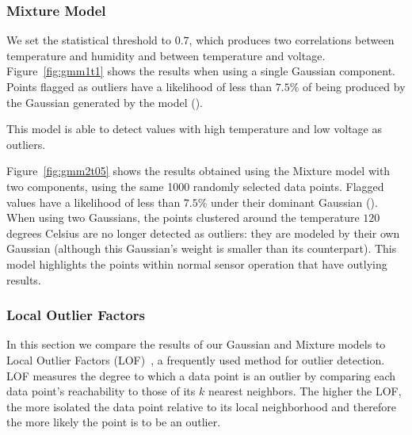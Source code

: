 \subsubsection{Mixture Model}
We set the statistical threshold to $0.7$, which produces two correlations between temperature and humidity and between temperature and voltage. 
Figure~\ref{fig:gmm1t1} shows the results when using a single Gaussian component. Points flagged as outliers have a likelihood of less than $7.5\%$ of being produced by the Gaussian generated by the model ().

This model is able to detect values with high temperature and low voltage as outliers.
 
 
Figure~\ref{fig:gmm2t05} shows the results obtained using the Mixture model with two components, using the same 1000 randomly selected data points. Flagged values have a likelihood of less than $7.5\%$ under their dominant Gaussian ().
When using two Gaussians, the points clustered around the temperature $120$ degrees Celsius are no longer detected as outliers: they are modeled by their own Gaussian (although this Gaussian's weight is smaller than its counterpart). This model highlights the points within normal sensor operation that have outlying results.


\subsubsection{Local Outlier Factors}
\label{sec:lof-evaluation}

In this section we compare the results of our Gaussian and Mixture models to Local Outlier Factors (LOF)~\cite{Breunig2000}, a frequently used method for outlier detection.
LOF measures the degree to which a data point is an outlier by comparing each data point's reachability to those of its $k$ nearest neighbors.
The higher the LOF, the more isolated the data point relative to its local neighborhood and therefore the more likely the point is to be an outlier.

